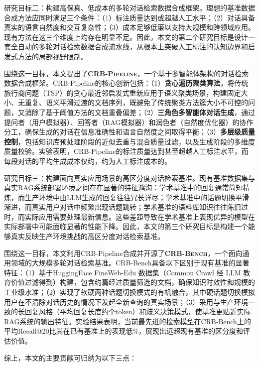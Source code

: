 研究目标二：构建高保真、低成本的多轮对话检索数据合成框架。理想的基准数据合成方法应同时满足三个条件：（1）标注质量达到或超越人工水平；（2）对话具备真实的语言自然度和交互复杂性；（3）成本足够低廉以支持大规模和跨领域应用。现有方法在这三个维度上均存在明显不足。因此，本文的第二个研究目标是设计一套全自动的多轮对话检索数据合成流水线，从根本上突破人工标注的认知边界和启发式方法的局部视野限制。

围绕这一目标，本文提出了\textbf{\textsc{CRB-Pipeline}}，一个基于多智能体架构的对话检索数据合成框架。CRB-Pipeline的核心创新包括：（1）\textbf{贪心遍历聚类算法}，将传统旅行商问题（TSP）的贪心最近邻启发式重新应用于语义聚类场景，构建固定大小、无重复、语义平滑过渡的文档序列，既避免了传统聚类方法簇大小不可控的问题，又消除了基于阈值方法的文档重叠偏差；（2）\textbf{三角色多智能体对话生成}，通过提问者（用户模拟器）、回答者（RAG模拟器）和润色者（自然度优化器）的协作分工，确保生成的对话在信息准确性和语言自然度之间取得平衡；（3）\textbf{多层级质量控制}，包括知识库预处理阶段的近似去重与混合质量过滤，以及生成阶段的多维度质量校验。实验表明，CRB-Pipeline的标注质量达到甚至超越人工标注水平，而每段对话的平均生成成本仅约，约为人工标注成本的。

研究目标三：构建面向真实应用场景的高区分度对话检索基准。现有基准数据集与真实RAG系统部署环境之间存在显著的特征鸿沟：学术基准中的回复通常简短精炼，而生产环境中由LLM生成的回复往往冗长详尽；学术基准中的话题切换平滑渐进，而真实用户对话中频繁出现话题跳转；学术基准的语料库知识往往陈旧过时，而实际应用需要处理最新信息。这些差距导致在学术基准上表现优异的模型在实际部署中可能面临显著的性能下降。因此，本文的第三个研究目标是构建一个能够真实反映生产环境挑战的高区分度对话检索基准。

围绕这一目标，本文利用CRB-Pipeline合成并开源了\textbf{\textsc{CRB-Bench}}，一个面向通用领域的大规模多轮对话检索基准。CRB-Bench具备以下区别于现有基准的显著特征：（1）基于HuggingFace FineWeb-Edu 数据集（Common Crawl 经 LLM 教育价值过滤得到）构建，包含约篇经过质量筛选的文档，确保知识时效性和规模的工业级水准；（2）实现了软硬两种话题切换模式的有机融合，其中硬话题切换模拟用户在不清除对话历史的情况下发起全新查询的真实场景；（3）采用与生产环境一致的长回复风格（平均回复长度约个token）和歧义决策模式，使基准更贴近实际RAG系统的输出特征。实验结果表明，当前最先进的检索模型在CRB-Bench上的平均Recall@20比其在已有基准上的表现低\%，展现出远超现有基准的区分度和评估价值。



综上，本文的主要贡献可归纳为以下三点：

